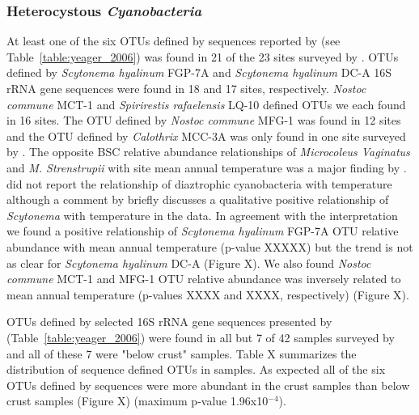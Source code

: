 \subsubsection{Heterocystous \textit{Cyanobacteria}}
At least one of the six OTUs defined by sequences reported by \citet{Yeager} (see Table~\ref{table:yeager_2006}) was found in 21 of the 23 sites surveyed by \citet{Garcia_Pichel_2013}. OTUs defined by \textit{Scytonema hyalinum} FGP-7A and \textit{Scytonema hyalinum} DC-A 16S rRNA gene sequences were found in 18 and 17 sites, respectively. \textit{Nostoc commune} MCT-1 and \textit{Spirirestis rafaelensis} LQ-10 defined OTUs we each found in 16 sites. The OTU defined by \textit{Nostoc commune} MFG-1 was found in 12 sites and the OTU defined by \textit{Calothrix} MCC-3A was only found in one site surveyed by \citet{Garcia_Pichel_2013}. The opposite BSC relative abundance relationships of \textit{Microcoleus Vaginatus} and \textit{M. Strenstrupii} with site mean annual temperature was a major finding by \citet{Garcia_Pichel_2013}. \citet{Garcia_Pichel_2013} did not report the relationship of diaztrophic cyanobacteria with temperature although a comment by \citet{Belnap28062013} briefly discusses a qualitative positive relationship of \textit{Scytonema} with temperature in the \citet{Garcia_Pichel_2013} data. In agreement with the \citet{Belnap28062013} interpretation we found a positive relationship of \textit{Scytonema hyalinum} FGP-7A OTU relative abundance with mean annual temperature (p-value XXXXX) but the trend is not as clear for \textit{Scytonema hyalinum} DC-A (Figure X). We also found \textit{Nostoc commune} MCT-1 and MFG-1 OTU relative abundance was inversely related to mean annual temperature (p-values XXXX and XXXX, respectively) (Figure X). 

OTUs defined by selected 16S rRNA gene sequences presented by \citet{Yeager} (Table~\ref{table:yeager_2006}) were found in all but 7 of 42 samples surveyed by \citet{Steven_2013} and all of these 7 were "below crust" samples. Table X summarizes the distribution of \citet{Yeager} sequence defined OTUs in \citet{Steven_2013} samples. As expected all of the six OTUs defined by \citet{Yeager} sequences were more abundant in the crust samples than below crust samples (Figure X) (maximum p-value 1.96x10$^{-4}$).
